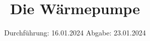 

\subject{V206}
\title{Die Wärmepumpe}
\date{%
  Durchführung: 16.01.2024
  \hspace{3em}
  Abgabe: 23.01.2024
}



\maketitle
\thispagestyle{empty}
\tableofcontents
\newpage






\printbibliography{}


